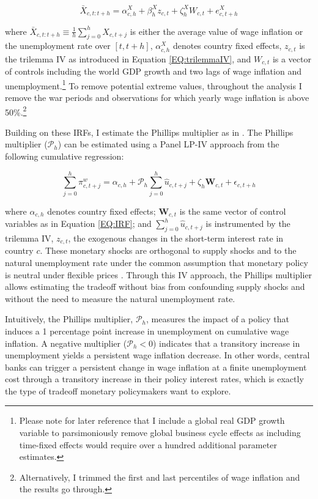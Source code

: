 \documentclass[12pt]{article}
\renewcommand{\vec}[1]{\mathbf{#1}}
\begin{document}
\begin{equation} \label{EQ:IRF}
	\bar{X}_{c,t:t+h} = \alpha^X_{c,h} + \beta_h^X z_{c,t} + \zeta^X_h W_{c,t} + e^X_{c,t+h}
\end{equation}

where $\bar{X}_{c,t:t+h} \equiv \frac{1}{h} \sum^h_{j=0} X_{c,t+j}$ is either the average value of wage inflation or the unemployment rate over $[t,t+h]$, $\alpha^X_{c,h}$ denotes country fixed effects, $z_{c,t}$ is the trilemma IV as introduced in Equation \eqref{EQ:trilemmaIV}, and $W_{c,t}$ is a vector of controls including the world GDP growth and two lags of wage inflation and unemployment.\footnote{Please note for later reference that I include a global real GDP growth variable to parsimoniously remove global business cycle effects as including time-fixed effects would require over a hundred additional parameter estimates.} To remove potential extreme values, throughout the analysis I remove the war periods and observations for which yearly wage inflation is above 50\%.\footnote{Alternatively, I trimmed the first and last percentiles of wage inflation and the results go through.}

Building on these IRFs, I estimate the Phillips multiplier as in \cite{Barnichon2019}. The Phillips multiplier ($\mathcal{P}_h$) can be estimated using a Panel LP-IV approach from the following cumulative regression:

\begin{equation} \label{EQ:MULT}
	\sum_{j=0}^{h} \pi_{c,t+j}^{w} = \alpha_{c,h} + \mathcal{P}_h \sum_{j=0}^{h} \hat{u}_{c,t+j} + \zeta_h \vec{W}_{c,t} + \epsilon_{c,t+h}
\end{equation}

where $\alpha_{c,h}$ denotes country fixed effects; $\vec{W}_{c,t}$ is the same vector of control variables as in Equation \eqref{EQ:IRF}; and $\sum_{j=0}^{h} \hat{u}_{c,t+j}$ is instrumented by the trilemma IV, $z_{c,t}$, the exogenous changes in the short-term interest rate in country $c$. These monetary shocks are orthogonal to supply shocks and to the natural unemployment rate under the common assumption that monetary policy is neutral under flexible prices \citep{Gali2015}. Through this IV approach, the Phillips multiplier allows estimating the tradeoff without bias from confounding supply shocks and without the need to measure the natural unemployment rate.

Intuitively, the Phillips multiplier, $\mathcal{P}_h$, measures the impact of a policy that induces a 1 percentage point increase in unemployment on cumulative wage inflation. A negative multiplier ($\mathcal{P}_h < 0$) indicates that a transitory increase in unemployment yields a persistent wage inflation decrease. In other words, central banks can trigger a persistent change in wage inflation at a finite unemployment cost through a transitory increase in their policy interest rates, which is exactly the type of tradeoff monetary policymakers want to explore.
\end{document}
